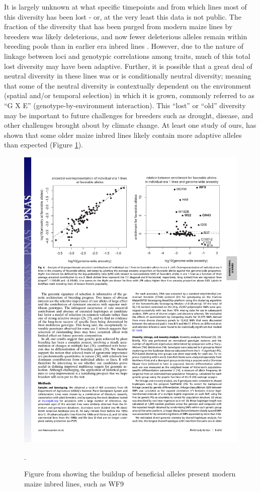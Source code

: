 \documentclass[12pt]{article}
\begin{document}
It is largely unknown at what specific timepoints and from which lines most of this diversity has been lost - or, at the very least this data is not public. The fraction of the diversity that has been purged from modern maize lines by breeders was likely deleterious, and now fewer deleterious alleles remain within breeding pools than in earlier era inbred lines \citep{Mezmouk:2014jd}. However, due to the nature of linkage between loci and genotypic correlations among traits, much of this total lost diversity may have been adaptive. Further, it is possible that a great deal of neutral diversity in these lines was or is conditionally neutral diversity; meaning that some of the neutral diversity is contextually dependent on the environment (spatial and/or temporal selection) in which it is grown, commonly referred to as ``G X E'' (genotype-by-environment interaction). This ``lost'' or ``old'' diversity may be important to future challenges for breeders such as drought, disease, and other challenges brought about by climate change. At least one study of ours, has shown that some older maize inbred lines likely contain more adaptive alleles than expected (Figure \ref{fig:joost}).


\begin{figure}[p]
\includegraphics[width=1.0\linewidth]{joost_wf9.pdf}
\caption{Figure from \citep{vanHeerwaarden:2012im} showing the buildup of beneficial alleles present modern maize inbred lines, such as WF9}. 
\label{fig:joost}
\end{figure}
\end{document}
